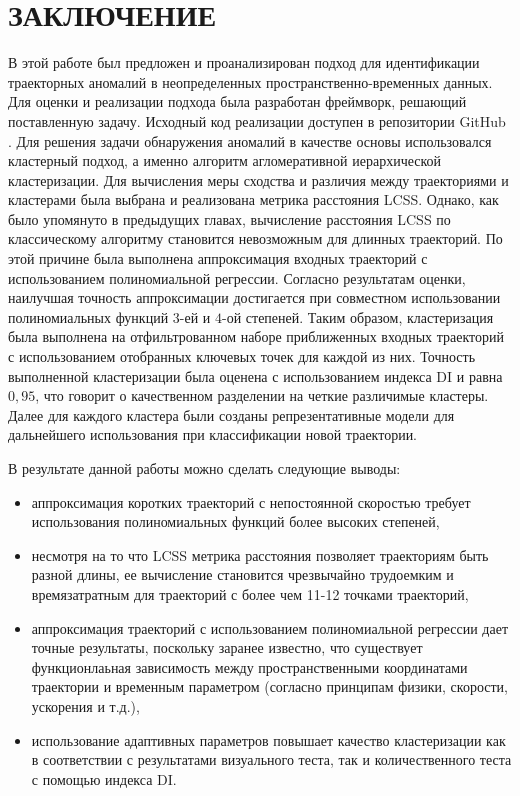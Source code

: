 \chapter{ЗАКЛЮЧЕНИЕ}
\label{ch:ЗАКЛЮЧЕНИЕ}

В этой работе был предложен и проанализирован подход для идентификации траекторных аномалий в неопределенных пространственно-временных данных. Для оценки и реализации подхода была разработан фреймворк, решающий поставленную задачу. Исходный код реализации доступен в репозитории GitHub \cite{online:mt_anomalies}. Для решения задачи обнаружения аномалий в качестве основы использовался кластерный подход, а именно алгоритм агломеративной иерархической кластеризации. Для вычисления меры сходства и различия между траекториями и кластерами была выбрана и реализована метрика расстояния LCSS. Однако, как было упомянуто в предыдущих главах, вычисление расстояния LCSS по классическому алгоритму становится невозможным для длинных траекторий. По этой причине была выполнена аппроксимация входных траекторий с использованием полиномиальной регрессии. Согласно результатам оценки, наилучшая точность аппроксимации достигается при совместном использовании полиномиальных функций $3$-ей и $4$-ой степеней. Таким образом, кластеризация была выполнена на отфильтрованном наборе приближенных входных траекторий с использованием отобранных ключевых точек для каждой из них. Точность выполненной кластеризации была оценена с использованием индекса DI и равна $0,95$, что говорит о качественном разделении на четкие различимые кластеры. Далее для каждого кластера были созданы репрезентативные модели для дальнейшего использования при классификации новой траектории.

В результате данной работы можно сделать следующие выводы:
\begin{itemize}
	\setlength\itemsep{-0.5em}
	\item аппроксимация коротких траекторий с непостоянной скоростью требует использования полиномиальных функций более высоких степеней,
	\item несмотря на то что LCSS метрика расстояния позволяет траекториям быть разной длины, ее вычисление становится чрезвычайно трудоемким и времязатратным  для траекторий с более чем 11-12 точками траекторий,
	\item аппроксимация траекторий с использованием полиномиальной регрессии дает точные результаты, поскольку заранее известно, что существует функционлаьная зависимость между пространственными координатами траектории и временным параметром (согласно принципам физики, скорости, ускорения и т.д.),
	\item использование адаптивных параметров повышает качество кластеризации как в соответствии с результатами визуального теста, так и количественного теста с помощью индекса DI.
	
\end{itemize}

